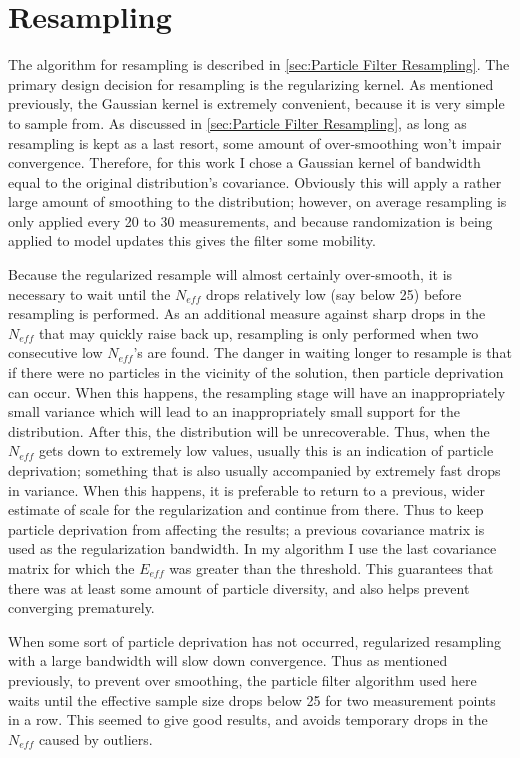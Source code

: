 \section{Resampling}
The algorithm for resampling is described in \autoref{sec:Particle Filter Resampling}.
The primary design decision for resampling is the regularizing
kernel. As mentioned previously, the Gaussian kernel is extremely convenient,
because it is very simple to sample from. As discussed in \autoref{sec:Particle Filter Resampling},
as long as resampling is kept as a last resort, some amount of over-smoothing
won't impair convergence. Therefore, for this work I chose a Gaussian kernel of
bandwidth equal to the original distribution's covariance. Obviously this will
apply a rather large amount of smoothing to the distribution; however, on average
resampling is only applied every 20 to 30 measurements, and because randomization
is being applied to model updates this gives the filter some mobility. 

Because the regularized resample will almost certainly over-smooth,
it is necessary to wait until the $N_{eff}$ drops relatively low
(say below 25) before resampling is performed. As an additional 
measure against sharp drops in the $N_{eff}$ that may quickly raise
back up, resampling is only performed when two consecutive low
$N_{eff}$'s are found. 
The danger in waiting longer to resample is that if there were no
particles in the vicinity of the solution, then particle deprivation
can occur.  When this happens, the resampling
stage will have an inappropriately small variance which will lead to an 
inappropriately small support for the distribution. After this, the 
distribution will be unrecoverable. Thus, when the $N_{eff}$ gets down
to extremely low values, usually this is an indication of particle
deprivation; something that is also usually accompanied by extremely
fast drops in variance. When this happens, it is preferable 
to return to a previous, wider estimate of scale for the regularization
and continue from there. Thus to keep particle deprivation from 
affecting the results; a previous covariance matrix is 
used as the regularization bandwidth. In my algorithm I use
the last covariance matrix for which the $E_{eff}$ was greater than
the threshold. This guarantees that there was at least some amount of 
particle diversity, and also helps prevent converging prematurely.

When some sort of particle deprivation has not occurred, regularized
resampling with a large bandwidth will slow down convergence. Thus
as mentioned previously, to prevent over smoothing, the particle
filter algorithm used here waits until 
the effective sample size drops below 25 for two measurement points
in a row. This seemed to give good results, and avoids
temporary drops in the $N_{eff}$ caused by outliers. 

